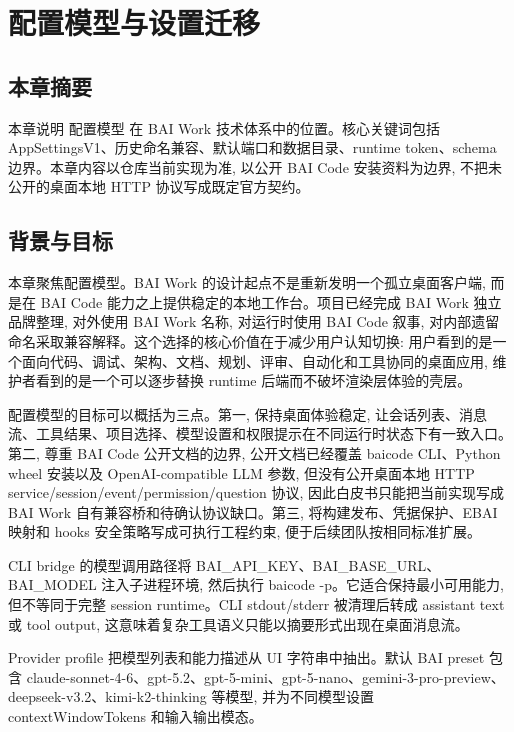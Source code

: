 \chapter{配置模型与设置迁移}
\section{本章摘要}
本章说明 配置模型 在 BAI Work 技术体系中的位置。核心关键词包括 AppSettingsV1、历史命名兼容、默认端口和数据目录、runtime token、schema 边界。本章内容以仓库当前实现为准, 以公开 BAI Code 安装资料为边界, 不把未公开的桌面本地 HTTP 协议写成既定官方契约。

\section{背景与目标}
本章聚焦配置模型。BAI Work 的设计起点不是重新发明一个孤立桌面客户端, 而是在 BAI Code 能力之上提供稳定的本地工作台。项目已经完成 BAI Work 独立品牌整理, 对外使用 BAI Work 名称, 对运行时使用 BAI Code 叙事, 对内部遗留命名采取兼容解释。这个选择的核心价值在于减少用户认知切换: 用户看到的是一个面向代码、调试、架构、文档、规划、评审、自动化和工具协同的桌面应用, 维护者看到的是一个可以逐步替换 runtime 后端而不破坏渲染层体验的壳层。

配置模型的目标可以概括为三点。第一, 保持桌面体验稳定, 让会话列表、消息流、工具结果、项目选择、模型设置和权限提示在不同运行时状态下有一致入口。第二, 尊重 BAI Code 公开文档的边界, 公开文档已经覆盖 baicode CLI、Python wheel 安装以及 OpenAI-compatible LLM 参数, 但没有公开桌面本地 HTTP service/session/event/permission/question 协议, 因此白皮书只能把当前实现写成 BAI Work 自有兼容桥和待确认协议缺口。第三, 将构建发布、凭据保护、EBAI 映射和 hooks 安全策略写成可执行工程约束, 便于后续团队按相同标准扩展。

CLI bridge 的模型调用路径将 BAI\_API\_KEY、BAI\_BASE\_URL、BAI\_MODEL 注入子进程环境, 然后执行 baicode -p。它适合保持最小可用能力, 但不等同于完整 session runtime。CLI stdout/stderr 被清理后转成 assistant text 或 tool output, 这意味着复杂工具语义只能以摘要形式出现在桌面消息流。

Provider profile 把模型列表和能力描述从 UI 字符串中抽出。默认 BAI preset 包含 claude-sonnet-4-6、gpt-5.2、gpt-5-mini、gpt-5-nano、gemini-3-pro-preview、deepseek-v3.2、kimi-k2-thinking 等模型, 并为不同模型设置 contextWindowTokens 和输入输出模态。

